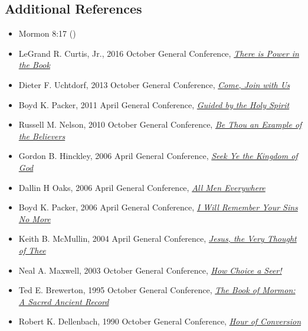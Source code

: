 \documentclass[12pt]{report}
\begin{document}
\subsection{Additional References\label{titlePage:references3}}
\begin{itemize}
\item Mormon 8:17 ()
\item LeGrand R. Curtis, Jr., 2016 October General Conference, \href{https://www.lds.org/general-conference/2016/10/there-is-power-in-the-book?lang=eng}{\emph{There is Power in the Book}}
\item Dieter F. Uchtdorf, 2013 October General Conference, \href{https://www.lds.org/general-conference/2013/10/come-join-with-us?lang=eng}{\emph{Come, Join with Us}}
\item Boyd K. Packer, 2011 April General Conference, \href{https://www.lds.org/general-conference/2011/04/guided-by-the-holy-spirit?lang=eng}{\emph{Guided by the Holy Spirit}}
\item Russell M. Nelson, 2010 October General Conference, \href{https://www.lds.org/general-conference/2010/10/be-thou-an-example-of-the-believers?lang=eng}{\emph{Be Thou an Example of the Believers}}
\item Gordon B. Hinckley, 2006 April General Conference, \href{https://www.lds.org/general-conference/2006/04/seek-ye-the-kingdom-of-god?lang=eng}{\emph{Seek Ye the Kingdom of God}}
\item Dallin H Oaks, 2006 April General Conference, \href{https://www.lds.org/general-conference/2006/04/all-men-everywhere?lang=eng}{\emph{All Men Everywhere}}
\item Boyd K. Packer, 2006 April General Conference, \href{https://www.lds.org/general-conference/2006/04/i-will-remember-your-sins-no-more?lang=eng}{\emph{I Will Remember Your Sins No More}}
\item Keith B. McMullin, 2004 April General Conference, \href{https://www.lds.org/general-conference/2004/04/jesus-the-very-thought-of-thee?lang=eng}{\emph{Jesus, the Very Thought of Thee}}
\item Neal A. Maxwell, 2003 October General Conference, \href{https://www.lds.org/general-conference/2003/10/how-choice-a-seer?lang=eng}{\emph{How Choice a Seer!}}
\item Ted E. Brewerton, 1995 October General Conference, \href{https://www.lds.org/general-conference/1995/10/the-book-of-mormon-a-sacred-ancient-record?lang=eng}{\emph{The Book of Mormon: A Sacred Ancient Record}}
\item Robert K. Dellenbach, 1990 October General Conference, \href{https://www.lds.org/ensign/1990/11/hour-of-conversion?lang=eng}{\emph{Hour of Conversion}}

\end{itemize}
\end{document}
